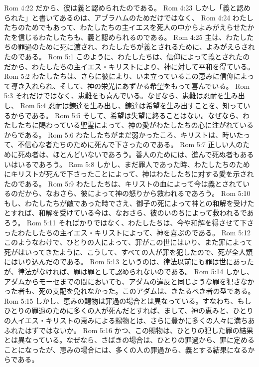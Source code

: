 Rom 4:22  だから、彼は義と認められたのである。
Rom 4:23  しかし「義と認められた」と書いてあるのは、アブラハムのためだけではなく、
Rom 4:24  わたしたちのためでもあって、わたしたちの主イエスを死人の中からよみがえらせたかたを信じるわたしたちも、義と認められるのである。
Rom 4:25  主は、わたしたちの罪過のために死に渡され、わたしたちが義とされるために、よみがえらされたのである。
Rom 5:1  このように、わたしたちは、信仰によって義とされたのだから、わたしたちの主イエス・キリストにより、神に対して平和を得ている。
Rom 5:2  わたしたちは、さらに彼により、いま立っているこの恵みに信仰によって導き入れられ、そして、神の栄光にあずかる希望をもって喜んでいる。
Rom 5:3  それだけではなく、患難をも喜んでいる。なぜなら、患難は忍耐を生み出し、
Rom 5:4  忍耐は錬達を生み出し、錬達は希望を生み出すことを、知っているからである。
Rom 5:5  そして、希望は失望に終ることはない。なぜなら、わたしたちに賜わっている聖霊によって、神の愛がわたしたちの心に注がれているからである。
Rom 5:6  わたしたちがまだ弱かったころ、キリストは、時いたって、不信心な者たちのために死んで下さったのである。
Rom 5:7  正しい人のために死ぬ者は、ほとんどいないであろう。善人のためには、進んで死ぬ者もあるいはいるであろう。
Rom 5:8  しかし、まだ罪人であった時、わたしたちのためにキリストが死んで下さったことによって、神はわたしたちに対する愛を示されたのである。
Rom 5:9  わたしたちは、キリストの血によって今は義とされているのだから、なおさら、彼によって神の怒りから救われるであろう。
Rom 5:10  もし、わたしたちが敵であった時でさえ、御子の死によって神との和解を受けたとすれば、和解を受けている今は、なおさら、彼のいのちによって救われるであろう。
Rom 5:11  そればかりではなく、わたしたちは、今や和解を得させて下さったわたしたちの主イエス・キリストによって、神を喜ぶのである。
Rom 5:12  このようなわけで、ひとりの人によって、罪がこの世にはいり、また罪によって死がはいってきたように、こうして、すべての人が罪を犯したので、死が全人類にはいり込んだのである。
Rom 5:13  というのは、律法以前にも罪は世にあったが、律法がなければ、罪は罪として認められないのである。
Rom 5:14  しかし、アダムからモーセまでの間においても、アダムの違反と同じような罪を犯さなかった者も、死の支配を免れなかった。このアダムは、きたるべき者の型である。
Rom 5:15  しかし、恵みの賜物は罪過の場合とは異なっている。すなわち、もしひとりの罪過のために多くの人が死んだとすれば、まして、神の恵みと、ひとりの人イエス・キリストの恵みによる賜物とは、さらに豊かに多くの人々に満ちあふれたはずではないか。
Rom 5:16  かつ、この賜物は、ひとりの犯した罪の結果とは異なっている。なぜなら、さばきの場合は、ひとりの罪過から、罪に定めることになったが、恵みの場合には、多くの人の罪過から、義とする結果になるからである。
